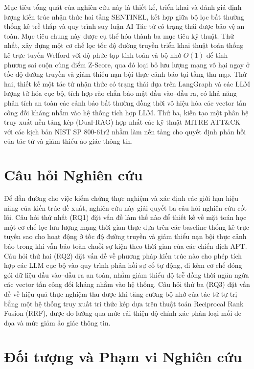 Mục tiêu tổng quát của nghiên cứu này là thiết kế, triển khai và đánh giá định lượng kiến trúc nhận thức hai tầng SENTINEL, kết hợp giữa bộ lọc bất thường thống kê trễ thấp và quy trình suy luận AI Tác tử có trạng thái được bảo vệ an toàn. Mục tiêu chung này được cụ thể hóa thành ba mục tiêu kỹ thuật. Thứ nhất, xây dựng một cơ chế lọc tốc độ đường truyền triển khai thuật toán thống kê trực tuyến Welford với độ phức tạp tính toán và bộ nhớ $O(1)$ để tính phương sai cuộn cùng điểm Z-Score, qua đó loại bỏ lưu lượng mạng vô hại ngay ở tốc độ đường truyền và giảm thiểu nạn bội thực cảnh báo tại tầng thu nạp. Thứ hai, thiết kế một tác tử nhận thức có trạng thái dựa trên LangGraph và các LLM lượng tử hóa cục bộ, tích hợp rào chắn bảo mật đầu vào--đầu ra, có khả năng phân tích an toàn các cảnh báo bất thường đồng thời vô hiệu hóa các vector tấn công đối kháng nhắm vào hệ thống tích hợp LLM. Thứ ba, kiến tạo một phân hệ truy xuất nền tảng kép (Dual-RAG) hợp nhất các kỹ thuật MITRE ATT\&CK với các kịch bản NIST SP 800-61r2 nhằm làm nền tảng cho quyết định phản hồi của tác tử và giảm thiểu ảo giác thông tin.

\section{Câu hỏi Nghiên cứu}

Để dẫn đường cho việc kiểm chứng thực nghiệm và xác định các giới hạn hiệu năng của kiến trúc đề xuất, nghiên cứu này giải quyết ba câu hỏi nghiên cứu cốt lõi. Câu hỏi thứ nhất (RQ1) đặt vấn đề làm thế nào để thiết kế về mặt toán học một cơ chế lọc lưu lượng mạng thời gian thực dựa trên các baseline thống kê trực tuyến sao cho hoạt động ở tốc độ đường truyền và giảm thiểu nạn bội thực cảnh báo trong khi vẫn bảo toàn chuỗi sự kiện theo thời gian của các chiến dịch APT. Câu hỏi thứ hai (RQ2) đặt vấn đề về phương pháp kiến trúc nào cho phép tích hợp các LLM cục bộ vào quy trình phản hồi sự cố tự động, đi kèm cơ chế đóng gói dữ liệu đầu vào--đầu ra an toàn, nhằm giảm thiểu độ trễ đồng thời ngăn ngừa các vector tấn công đối kháng nhắm vào hệ thống. Câu hỏi thứ ba (RQ3) đặt vấn đề về hiệu quả thực nghiệm thu được khi tăng cường bộ nhớ của tác tử tự trị bằng một hệ thống truy xuất tri thức kép dựa trên thuật toán Reciprocal Rank Fusion (RRF), được đo lường qua mức cải thiện độ chính xác phân loại mối đe dọa và mức giảm ảo giác thông tin.

\section{Đối tượng và Phạm vi Nghiên cứu}

